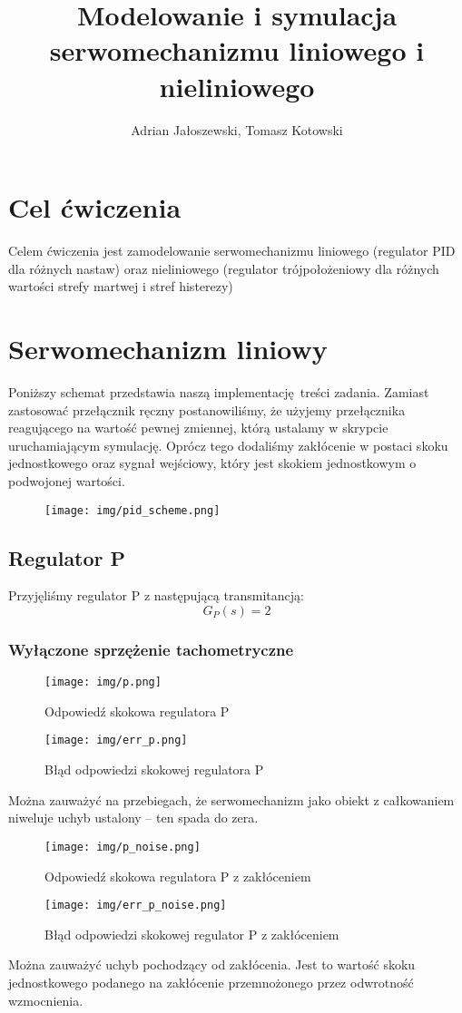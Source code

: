 \documentclass[a4paper, 12pt, titlepage]{article}
\title{Modelowanie i symulacja serwomechanizmu liniowego i nieliniowego}
\author{Adrian Jałoszewski, Tomasz Kotowski}
\date{}
\begin{document}
	\maketitle
	\section{Cel ćwiczenia}
		Celem ćwiczenia jest zamodelowanie serwomechanizmu liniowego (regulator PID dla różnych nastaw) oraz nieliniowego (regulator trójpołożeniowy dla różnych wartości strefy martwej i stref histerezy)
	\section{Serwomechanizm liniowy}
		Poniższy schemat przedstawia naszą implementację treści zadania. Zamiast zastosować przełącznik ręczny postanowiliśmy, że użyjemy przełącznika reagującego na wartość pewnej zmiennej, którą ustalamy w skrypcie uruchamiającym symulację. Oprócz tego dodaliśmy zakłócenie w postaci skoku jednostkowego oraz sygnał wejściowy, który jest skokiem jednostkowym o podwojonej wartości.
		\begin{figure}[H]
			\centering
			\texttt{[image: img/pid\_scheme.png]}
		\end{figure}
		\subsection{Regulator P}
			Przyjęliśmy regulator P z następującą transmitancją:
			$$
				G_P(s) = 2
			$$
			\subsubsection{Wyłączone sprzężenie tachometryczne}
				\begin{figure}[H]
					\centering
					\texttt{[image: img/p.png]}
					\caption{Odpowiedź skokowa regulatora P}
				\end{figure}
				\begin{figure}[H]
					\centering
					\texttt{[image: img/err\_p.png]}
					\caption{Błąd odpowiedzi skokowej regulatora P}
				\end{figure}
				Można zauważyć na przebiegach, że serwomechanizm jako obiekt z całkowaniem niweluje uchyb ustalony -- ten spada do zera.
				\begin{figure}[H]
					\centering
					\texttt{[image: img/p\_noise.png]}
					\caption{Odpowiedź skokowa regulatora P z zakłóceniem}
				\end{figure}
				\begin{figure}[H]
					\centering
					\texttt{[image: img/err\_p\_noise.png]}
					\caption{Błąd odpowiedzi skokowej regulator P z zakłóceniem}
				\end{figure} \noindent
				Można zauważyć uchyb pochodzący od zakłócenia. Jest to wartość skoku jednostkowego podanego na zakłócenie przemnożonego przez odwrotność wzmocnienia.
\end{document}
